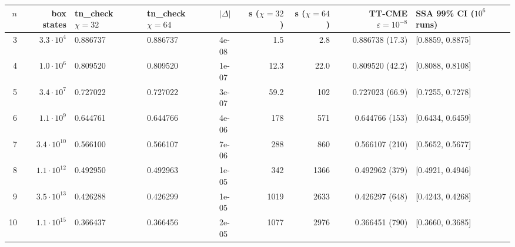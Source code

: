 \begin{tabular}{rrlllrrrl}
\toprule
$n$ & box states & tn\_check $\chi{=}32$ & tn\_check $\chi{=}64$ & $|\Delta|$ & s ($\chi{=}32$) & s ($\chi{=}64$) & TT-CME $\varepsilon{=}10^{-8}$ & SSA 99\% CI ($10^6$ runs) \\
\midrule
3 & $3.3\cdot 10^{4}$ & 0.886737 & 0.886737 & 4e-08 & 1.5 & 2.8 & 0.886738 (17.3) & [0.8859, 0.8875] \\
4 & $1.0\cdot 10^{6}$ & 0.809520 & 0.809520 & 1e-07 & 12.3 & 22.0 & 0.809520 (42.2) & [0.8088, 0.8108] \\
5 & $3.4\cdot 10^{7}$ & 0.727022 & 0.727022 & 3e-07 & 59.2 & 102 & 0.727023 (66.9) & [0.7255, 0.7278] \\
6 & $1.1\cdot 10^{9}$ & 0.644761 & 0.644766 & 4e-06 & 178 & 571 & 0.644766 (153) & [0.6434, 0.6459] \\
7 & $3.4\cdot 10^{10}$ & 0.566100 & 0.566107 & 7e-06 & 288 & 860 & 0.566107 (210) & [0.5652, 0.5677] \\
8 & $1.1\cdot 10^{12}$ & 0.492950 & 0.492963 & 1e-05 & 342 & 1366 & 0.492962 (379) & [0.4921, 0.4946] \\
9 & $3.5\cdot 10^{13}$ & 0.426288 & 0.426299 & 1e-05 & 1019 & 2633 & 0.426297 (648) & [0.4243, 0.4268] \\
10 & $1.1\cdot 10^{15}$ & 0.366437 & 0.366456 & 2e-05 & 1077 & 2976 & 0.366451 (790) & [0.3660, 0.3685] \\
\bottomrule
\end{tabular}
